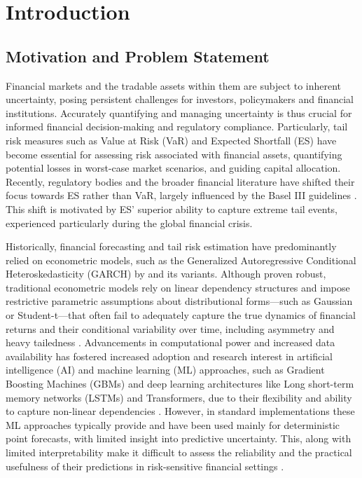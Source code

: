 \section{Introduction}
\label{sec:1_introduction}



\subsection{Motivation and Problem Statement}
\label{sec:motivation_problem_statement}
Financial markets and the tradable assets within them are subject to inherent uncertainty, posing persistent challenges for investors, policymakers and financial institutions. Accurately quantifying and managing uncertainty is thus crucial for informed financial decision-making and regulatory compliance. Particularly, tail risk measures such as Value at Risk (VaR) and Expected Shortfall (ES) have become essential for assessing risk associated with financial assets, quantifying potential losses in worst-case market scenarios, and guiding capital allocation. Recently, regulatory bodies and the broader financial literature have shifted their focus towards ES rather than VaR, largely influenced by the Basel III guidelines \parencite{basel2011, basel2019}. This shift is motivated by ES' superior ability to capture extreme tail events, experienced particularly during the global financial crisis.

Historically, financial forecasting and tail risk estimation have predominantly relied on econometric models, such as the Generalized Autoregressive Conditional Heteroskedasticity (GARCH) by \textcite{bollerslev1986garch} and its variants. Although proven robust, traditional econometric models rely on linear dependency structures and impose restrictive parametric assumptions about distributional forms—such as Gaussian or Student-t—that often fail to adequately capture the true dynamics of financial returns and their conditional variability over time, including asymmetry and heavy tailedness \parencite{Cont2001}. Advancements in computational power and increased data availability has fostered increased adoption and research interest in artificial intelligence (AI) and machine learning (ML) approaches, such as Gradient Boosting Machines (GBMs) and deep learning architectures like Long short-term memory networks (LSTMs) and Transformers, due to their flexibility and ability to capture non-linear dependencies \parencite{Sezer2020}. However, in standard implementations these ML approaches typically provide and have been used mainly for deterministic point forecasts, with limited insight into predictive uncertainty. This, along with limited interpretability make it difficult to assess the reliability and the practical usefulness of their predictions in risk-sensitive financial settings \parencite{Engelberg2009}. 

